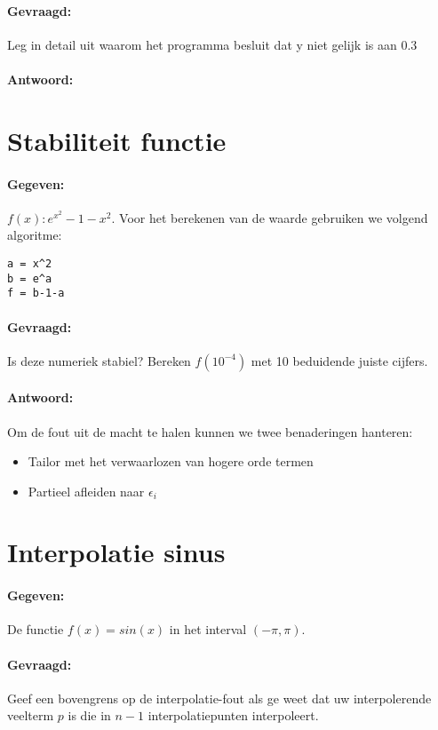 \documentclass[12pt]{article}
\begin{document}
\paragraph{Gevraagd:} Leg in detail uit waarom het programma besluit dat y niet gelijk is aan 0.3
\paragraph{Antwoord:}

\newpage

\section{Stabiliteit functie}
\paragraph{Gegeven:}  $f(x):e^{x^2}-1-x^2$. Voor het berekenen van de waarde gebruiken we volgend algoritme:
\begin{lstlisting}
a = x^2
b = e^a
f = b-1-a
\end{lstlisting}
\paragraph{Gevraagd:} Is deze numeriek stabiel? Bereken $f(10^{-4})$ met 10 beduidende juiste cijfers.
\paragraph{Antwoord:} Om de fout uit de macht te halen kunnen we twee benaderingen hanteren:
\begin{itemize}
	\item Tailor met het verwaarlozen van hogere orde termen
	\item Partieel afleiden naar $\epsilon_i$
\end{itemize}

\newpage


\section{Interpolatie sinus}
\paragraph{Gegeven:} De  functie $f(x) = sin(x)$ in het interval $(-\pi,\pi)$.
\paragraph{Gevraagd:} Geef een bovengrens op de interpolatie-fout als ge weet dat uw interpolerende veelterm $p$ is die in $n-1$ interpolatiepunten interpoleert.
\end{document}
